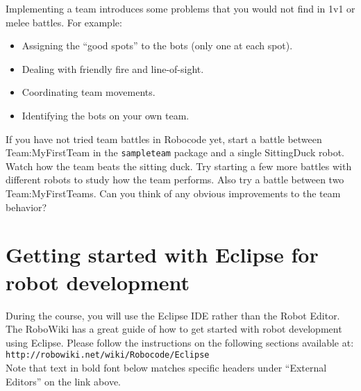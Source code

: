 \documentclass{scrreprt}
\begin{document}
Implementing a team introduces some problems that you would not find in 1v1 or melee battles. For example:

\begin{itemize}
\item Assigning the ``good spots'' to the bots (only one at each spot).
\item Dealing with friendly fire and line-of-sight.
\item Coordinating team movements.
\item Identifying the bots on your own team. 
\end{itemize}

If you have not tried team battles in Robocode yet, start a battle between Team:MyFirstTeam in the \texttt{sampleteam} package and a single SittingDuck robot. Watch how the team beats the sitting duck. Try starting a few more battles with different robots to study how the team performs. Also try a battle between two Team:MyFirstTeams. Can you think of any obvious improvements to the team behavior?

\newpage

\section{Getting started with Eclipse for robot development} \label{sec:eclipse}
During the course, you will use the Eclipse IDE rather than the Robot Editor. The RoboWiki has a great guide of how to get started with robot development using Eclipse. Please follow the instructions on the following sections available at:\\\texttt{http://robowiki.net/wiki/Robocode/Eclipse}
\\
Note that text in bold font below matches specific headers under ``External Editors'' on the link above.
\end{document}
